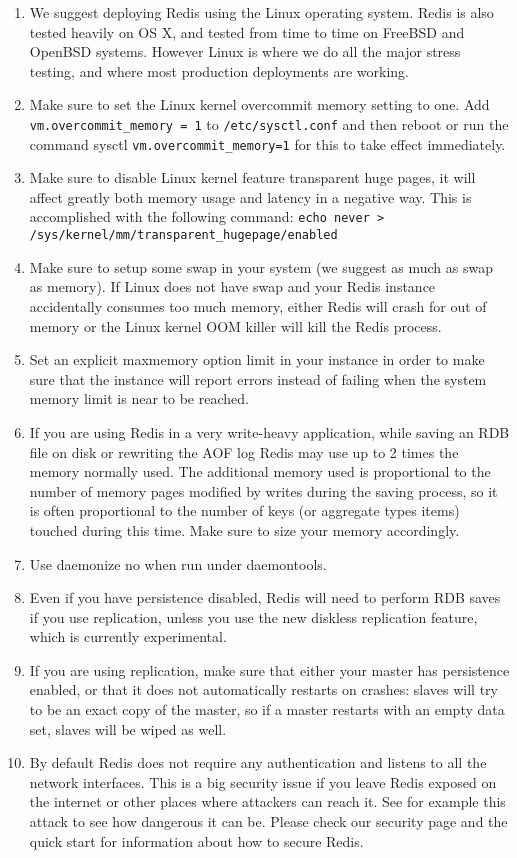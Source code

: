 \begin{enumerate}
\item We suggest deploying Redis using the Linux operating system. Redis is also tested heavily on OS X, and tested from time to time on FreeBSD and OpenBSD systems. However Linux is where we do all the major stress testing, and where most production deployments are working.
\item Make sure to set the Linux kernel overcommit memory setting to one. Add \lstinline{vm.overcommit_memory = 1} to \lstinline{/etc/sysctl.conf} and then reboot or run the command sysctl \lstinline{vm.overcommit_memory=1} for this to take effect immediately.
\item Make sure to disable Linux kernel feature transparent huge pages, it will affect greatly both memory usage and latency in a negative way. This is accomplished with the following command: \lstinline{echo never > /sys/kernel/mm/transparent_hugepage/enabled}
\item Make sure to setup some swap in your system (we suggest as much as swap as memory). If Linux does not have swap and your Redis instance accidentally consumes too much memory, either Redis will crash for out of memory or the Linux kernel OOM killer will kill the Redis process.
\item Set an explicit maxmemory option limit in your instance in order to make sure that the instance will report errors instead of failing when the system memory limit is near to be reached.
\item If you are using Redis in a very write-heavy application, while saving an RDB file on disk or rewriting the AOF log Redis may use up to 2 times the memory normally used. The additional memory used is proportional to the number of memory pages modified by writes during the saving process, so it is often proportional to the number of keys (or aggregate types items) touched during this time. Make sure to size your memory accordingly.
\item Use daemonize no when run under daemontools.
\item Even if you have persistence disabled, Redis will need to perform RDB saves if you use replication, unless you use the new diskless replication feature, which is currently experimental.
\item If you are using replication, make sure that either your master has persistence enabled, or that it does not automatically restarts on crashes: slaves will try to be an exact copy of the master, so if a master restarts with an empty data set, slaves will be wiped as well.
\item By default Redis does not require any authentication and listens to all the network interfaces. This is a big security issue if you leave Redis exposed on the internet or other places where attackers can reach it. See for example this attack to see how dangerous it can be. Please check our security page and the quick start for information about how to secure Redis.
\end{enumerate}


